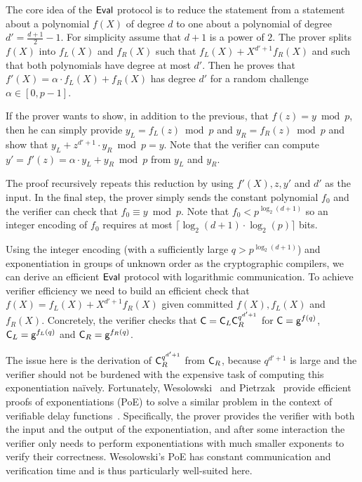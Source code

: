 \documentclass{article}
\theoremstyle{definition}
\begin{document}
The core idea of the $\textsf{{Eval}}$ protocol is to reduce the statement from a statement about a polynomial $f(X)$ of degree $d$ to one about a polynomial of degree $d'=\frac{d+1}{2}-1$. For simplicity assume that $d+1$ is a power of $2$.
The prover splits $f(X)$ into $f_L(X)$ and $f_R(X)$ such that $f_L(X)+X^{d'+1} f_R(X)$ and such that both polynomials have degree at most $d'$. Then he proves that $f'(X)=\alpha \cdot f_L(X) + f_R(X)$ has degree $d'$ for a random challenge $\alpha\in [0,p-1]$. 

If the prover wants to show, in addition to the previous, that $f(z)=y\bmod p$, then he can simply provide $y_L=f_L(z)\bmod p$ and $y_R=f_R(z)\bmod p$ and show that $y_L + z^{d'+1} \cdot y_R \bmod p=y$. Note that the verifier can compute $y' = f'(z) = \alpha \cdot y_L + y_R \bmod p$ from $y_L$ and $y_R$.

The proof recursively repeats this reduction by using $f'(X),z,y'$ and $d'$ as the input. In the final step, the prover simply sends the constant polynomial $f_0$ and the verifier can check that $f_0 \equiv y \bmod p$. Note that $f_0< p^{\log_2(d+1)}$ so an integer encoding of $f_0$ requires at most $\lceil \log_2(d+1) \cdot \log_2(p)\rceil$ bits.

Using the integer encoding (with a sufficiently large $q>p^{\log_2(d+1)}$) and exponentiation in groups of unknown order as the cryptographic compilers, we can derive an efficient $\textsf{{Eval}}$ protocol with logarithmic communication. To achieve verifier efficiency we need to build an efficient check that $f(X) = f_L(X) + X^{d'+1} f_R(X)$ given committed $f(X), f_L(X)$ and $f_R(X)$. Concretely, the verifier checks that $\mathsf{C} = \mathsf{C}_L \mathsf{C}_R^{q^{d'+1}}$ for $\mathsf{C}=\mathsf{g}^{f(q)}$, $\mathsf{C}_L=\mathsf{g}^{f_L(q)}$ and $\mathsf{C}_R=\mathsf{g}^{f_R(q)}$.

The issue here is the derivation of $\mathsf{C}_R^{q^{d'+1}}$ from $\mathsf{C}_R$, because $q^{d'+1}$ is large and the verifier should not be burdened with the expensive task of computing this exponentiation naïvely. Fortunately, Wesolowski~\cite{EC:Wesolowski19} and Pietrzak~\cite{EPRINT:Pietrzak18b} provide efficient proofs of exponentiations (\textsf{PoE}) to solve a similar problem in the context of verifiable delay functions~\cite{C:BBBF18}. Specifically, the prover provides the verifier with both the input and the output of the exponentiation, and after some interaction the verifier only needs to perform exponentiations with much smaller exponents to verify their correctness. Wesolowski's \textsf{PoE} has constant communication and verification time and is thus particularly well-suited here.
\end{document}
